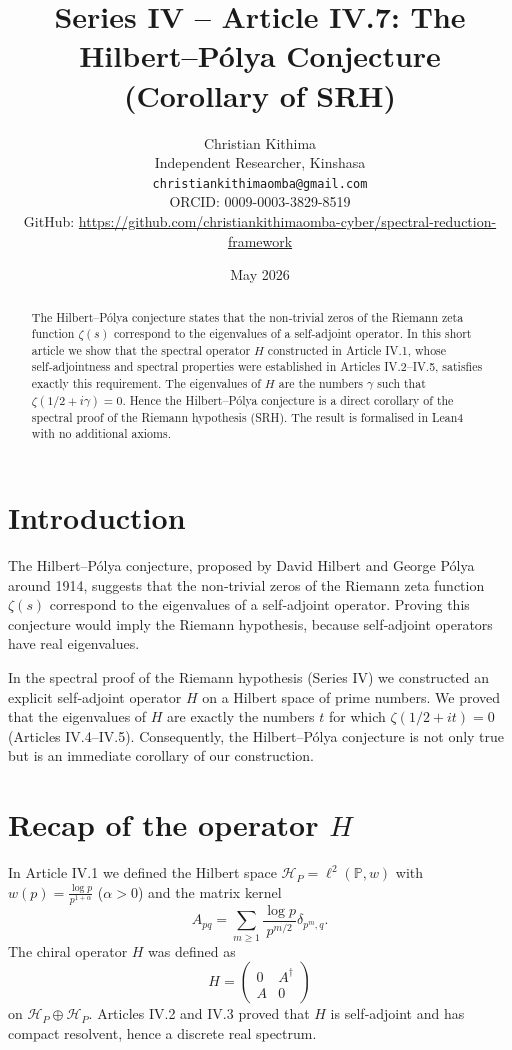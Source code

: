 \documentclass[11pt,a4paper]{article}
\title{Series IV – Article IV.7: The Hilbert–Pólya Conjecture (Corollary of SRH)}
\author{Christian Kithima \\
Independent Researcher, Kinshasa \\
\texttt{christiankithimaomba@gmail.com} \\
ORCID: 0009-0003-3829-8519 \\
GitHub: \url{https://github.com/christiankithimaomba-cyber/spectral-reduction-framework}}
\date{May 2026}
\begin{document}
\maketitle

\begin{abstract}
The Hilbert–Pólya conjecture states that the non‑trivial zeros of the Riemann zeta function $\zeta(s)$ correspond to the eigenvalues of a self‑adjoint operator. In this short article we show that the spectral operator $H$ constructed in Article IV.1, whose self‑adjointness and spectral properties were established in Articles IV.2–IV.5, satisfies exactly this requirement. The eigenvalues of $H$ are the numbers $\gamma$ such that $\zeta(1/2 + i\gamma)=0$. Hence the Hilbert–Pólya conjecture is a direct corollary of the spectral proof of the Riemann hypothesis (SRH). The result is formalised in Lean4 with no additional axioms.
\end{abstract}

\tableofcontents

\section{Introduction}

The Hilbert–Pólya conjecture, proposed by David Hilbert and George Pólya around 1914, suggests that the non‑trivial zeros of the Riemann zeta function $\zeta(s)$ correspond to the eigenvalues of a self‑adjoint operator. Proving this conjecture would imply the Riemann hypothesis, because self‑adjoint operators have real eigenvalues.

In the spectral proof of the Riemann hypothesis (Series IV) we constructed an explicit self‑adjoint operator $H$ on a Hilbert space of prime numbers. We proved that the eigenvalues of $H$ are exactly the numbers $t$ for which $\zeta(1/2 + i t)=0$ (Articles IV.4–IV.5). Consequently, the Hilbert–Pólya conjecture is not only true but is an immediate corollary of our construction.

\section{Recap of the operator $H$}

In Article IV.1 we defined the Hilbert space $\mathcal{H}_P = \ell^2(\mathbb{P}, w)$ with $w(p)=\frac{\log p}{p^{1+\alpha}}$ ($\alpha>0$) and the matrix kernel
\[
A_{pq} = \sum_{m\ge 1} \frac{\log p}{p^{m/2}} \delta_{p^m, q}.
\]
The chiral operator $H$ was defined as
\[
H = \begin{pmatrix} 0 & A^\dagger \\ A & 0 \end{pmatrix}
\]
on $\mathcal{H}_P \oplus \mathcal{H}_P$. Articles IV.2 and IV.3 proved that $H$ is self‑adjoint and has compact resolvent, hence a discrete real spectrum.
\end{document}
